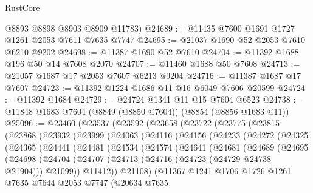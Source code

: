 \begin{lexlean}{RustCore}
\begin{coremodule}
      @8893
      @8898
      @8903
      @8909
      @11783)
@24689 := @11435 @7600 @1691 @1727 @1261 @2053 @7611 @7635 @7747
@24695 := @21037 @1690 @52 @2053 @7610 @6210 @9202
@24698 := @11387 @1690 @52 @7610
@24704 := @11392 @1688 @196 @50 @14 @7608 @2070
@24707 := @11460 @1688 @50 @7608
@24713 := @21057 @1687 @17 @2053 @7607 @6213 @9204
@24716 := @11387 @1687 @17 @7607
@24723 := @11392 @1224 @1686 @11 @16 @6049 @7606 @20599
@24724 := @11392 @1684
@24729 := @24724 @1341 @11 @15 @7604 @6523
@24738 := @11848 @1683 @7604 (@8849 (@8850 @7604)) (@8854 (@8856 @1683 @11))
@25096 := @23460
    (@23537
      (@23592
        (@23658
          (@23722
            (@23775
              (@23815
                (@23868
                  (@23932
                    (@23999
                      (@24063
                        (@24116
                          (@24156
                            (@24233
                              (@24272
                                (@24325
                                  (@24365
                                    (@24441
                                      (@24481
                                        (@24534
                                          (@24574
                                            (@24641
                                              (@24681
                                                (@24689
                                                  (@24695
                                                    (@24698
                                                      (@24704
                                                        (@24707
                                                          (@24713
                                                            (@24716 (@24723 (@24729 @24738 @21904)))
                                                            @21099))
                                                        @11412))
                                                    @21108)
                                                  (@11367
                                                    @1241
                                                    @1706
                                                    @1726
                                                    @1261
                                                    @7635
                                                    @7644
                                                    @2053
                                                    @7747
                                                    (@20634
                                                      @7635

\end{coremodule}
\end{lexlean}
